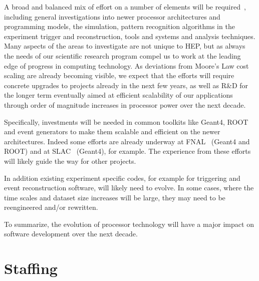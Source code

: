 A broad and balanced mix of
effort on a number of elements will be required~\cite{ARCHWP}, including
general
investigations into newer processor architectures and programming
models, the simulation, pattern recognition algorithms in the
experiment trigger and reconstruction, tools and systems and
analysis techniques. Many aspects of the areas to investigate are
not unique to HEP, but as always the needs of our
scientific research program compel us to work at the leading edge of
progress in computing technology. As deviations from Moore's Law
cost scaling are already becoming visible, we expect that the
efforts will require concrete upgrades to projects already in the
next few years, as well as R\&D for the longer term eventually aimed at
efficient scalability of our applications through order of magnitude
increases in processor power over the next decade.

Specifically, investments will be needed in common toolkits like Geant4,
ROOT and event generators to make them scalable and efficient on the 
newer architectures. Indeed some efforts are already underway at 
FNAL~\cite{FNALWP} (Geant4 and ROOT) and at SLAC~\cite{SLACWP} (Geant4), 
for example. The experience from these efforts will likely guide the way 
for other projects. 

In addition existing experiment specific codes, for example for triggering
and event reconstruction software, will likely need to evolve. In
some cases, where the time scales and dataset size increases will be
large, they may need to be reengineered and/or rewritten.

To summarize, the evolution of processor technology will have a major
impact on software development over the next decade. 

\section{Staffing}
\label{CpFI4:sec:staffing}

